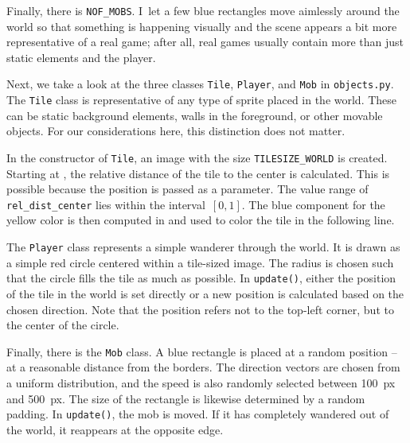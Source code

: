 Finally, there is \texttt{NOF\_MOBS}. I~let a few blue rectangles move aimlessly around the world so that something is happening visually and the scene appears a bit more representative of a real game; after all, real games usually contain more than just static elements and the player.



Next, we take a look at the three classes \texttt{Tile}, \texttt{Player}, and \texttt{Mob} in \texttt{objects.py}. The \texttt{Tile} class is representative of any type of sprite placed in the world. These can be static background elements, walls in the foreground, or other movable objects. For our considerations here, this distinction does not matter.

In the constructor of \texttt{Tile}, an image with the size \texttt{TILESIZE\_WORLD} is created. Starting at , the relative distance of the tile to the center is calculated. This is possible because the position is passed as a parameter. The value range of \texttt{rel\_dist\_center} lies within the interval~$[0,1]$. The blue component for the yellow color is then computed in  and used to color the tile in the following line.

The \texttt{Player} class represents a simple wanderer through the world. It is drawn as a simple red circle centered within a tile-sized image. The radius is chosen such that the circle fills the tile as much as possible. In \texttt{update()}, either the position of the tile in the world is set directly or a new position is calculated based on the chosen direction. Note that the position refers not to the top-left corner, but to the center of the circle.

Finally, there is the \texttt{Mob} class. A blue rectangle is placed at a random position -- at a reasonable distance from the borders. The direction vectors are chosen from a uniform distribution, and the speed is also randomly selected between \SI{100}{px} and \SI{500}{px}. The size of the rectangle is likewise determined by a random padding. In \texttt{update()}, the mob is moved. If it has completely wandered out of the world, it reappears at the opposite edge.



